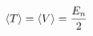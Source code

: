 

\vspace*{\fill}
\centering

\begin{align*}
    \expval{T} = \expval{V} = \frac{E_{n}}{2}
\end{align*}

\centering
\vspace*{\fill}

